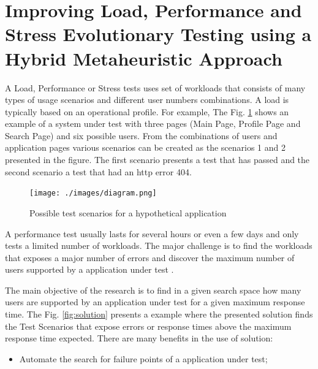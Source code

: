 \section{Improving Load, Performance and Stress Evolutionary Testing using a Hybrid Metaheuristic Approach}

A  Load, Performance or Stress tests uses set of workloads that consists of many types of usage scenarios and different user numbers combinations. A load is typically based on an operational profile. For example,  The Fig. \ref{fig:example} shows an example  of a system under test with three pages (Main Page, Profile Page and Search Page) and six possible users. From the combinations of users and application pages various scenarios can be created as the scenarios 1 and 2 presented in the figure. The first scenario presents a test that has passed and the second scenario a test that had an http error 404.

\begin{figure}[ht]
\centering
\caption{Possible test scenarios for a hypothetical application}
\texttt{[image: ./images/diagram.png]}
\label{fig:example}
\end{figure}


A performance test usually lasts for several hours or even a few days and only tests a limited number of workloads. The major challenge is to find the workloads  that exposes a major number of errors and discover the maximum number of users supported by a application under test \cite{Barna2011}. 


The main objective of the research is to find in a given search space how many users  are supported by an application under test for a given maximum response time. The Fig. \ref{fig:solution} presents a example where the presented solution finds the Test Scenarios that expose errors or response times above the maximum response time expected. There are many benefits in the use of solution:

\begin{itemize}
\item Automate the search for failure points of a application under test;
\end{itemize}




